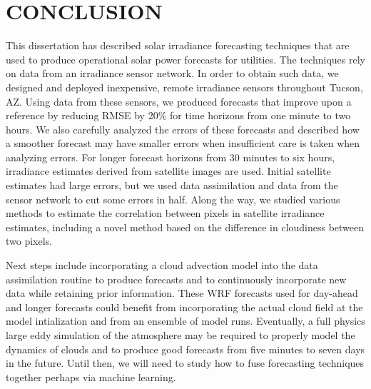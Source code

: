 \chapter{CONCLUSION}
\label{chap:conc}

This dissertation has described solar irradiance forecasting
techniques that are used to produce operational solar power forecasts
for utilities.
The techniques rely on data from an irradiance sensor network.
In order to obtain such data, we designed and deployed inexpensive,
remote irradiance sensors throughout Tucson, AZ.
Using data from these sensors, we produced forecasts that improve upon
a reference by reducing RMSE by 20\% for time horizons from one minute
to two hours.
We also carefully analyzed the errors of these forecasts and described
how a smoother forecast may have smaller errors when insufficient care
is taken when analyzing errors.
For longer forecast horizons from 30 minutes to six hours, irradiance
estimates derived from satellite images are used.
Initial satellite estimates had large errors, but we used data
assimilation and data from the sensor network to cut some errors in
half.
Along the way, we studied various methods to estimate the correlation
between pixels in satellite irradiance estimates, including a novel
method based on the difference in cloudiness between two pixels.

Next steps include incorporating a cloud advection model into the data
assimilation routine to produce forecasts and to continuously
incorporate new data while retaining prior information.
These WRF forecasts used for day-ahead and longer forecasts could
benefit from incorporating the actual cloud field at the model
intialization and from an ensemble of model runs.
Eventually, a full physics large eddy simulation of the atmosphere may
be required to properly model the dynamics of clouds and to produce
good forecasts from five minutes to seven days in the future.
Until then, we will need to study how to fuse forecasting techniques
together perhaps via machine learning.


